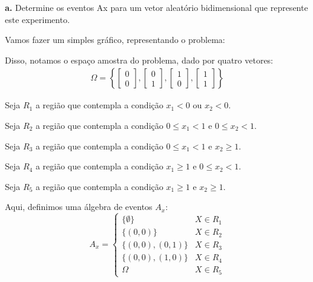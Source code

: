 \documentclass[a5paper]{report}
\begin{document}
\textbf{a.} Determine os eventos Ax para um vetor aleatório bidimensional que represente este experimento.

Vamos fazer um simples gráfico, representando o problema:

\begin{center}
\end{center}

Disso, notamos o espaço amostra do problema, dado por quatro vetores:
\begin{align*}
	\Omega = \left\{
	\begin{bmatrix}
		0\\
		0
	\end{bmatrix},
	\begin{bmatrix}
		0\\
		1
	\end{bmatrix},
	\begin{bmatrix}
		1\\
		0
	\end{bmatrix},
	\begin{bmatrix}
		1\\
		1
	\end{bmatrix}
	\right\}
\end{align*}

Seja $R_1$ a região que contempla a condição $x_1 < 0 \text{ ou } x_2 < 0$.

Seja $R_2$ a região que contempla a condição $0 \leq x_1 < 1 \text{ e } 0 \leq x_2 < 1$.

Seja $R_3$ a região que contempla a condição $0 \leq x_1 < 1 \text{ e } x_2 \geq 1$.

Seja $R_4$ a região que contempla a condição $x_1 \geq 1 \text{ e } 0 \leq x_2 < 1$.

Seja $R_5$ a região que contempla a condição $x_1 \geq 1 \text{ e } x_2 \geq 1$.

Aqui, definimos uma álgebra de eventos $A_x$:
\begin{equation*}
	A_x =
	\begin{cases}
		\{ \emptyset \} 	& X \in R_1\\
		\{(0, 0)\} 			& X \in R_2\\
		\{(0, 0), (0, 1)\}	& X \in R_3\\
		\{(0, 0), (1, 0)\}	& X \in R_4\\
		\Omega				& X \in R_5
	\end{cases}
\end{equation*}
\end{document}
